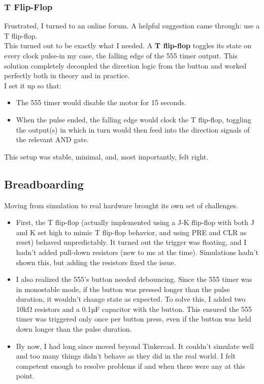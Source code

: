 \documentclass{article}
\begin{document}
\subsubsection{T Flip-Flop}
Frustrated, I turned to an online forum. A helpful suggestion came through: {use a T flip-flop.}\\
This turned out to be exactly what I needed. A \textbf{T flip-flop} toggles its state on every clock pulse-in my case, the falling edge of the 555 timer output. This solution completely decoupled the direction logic from the button and worked perfectly both in theory and in practice.\\[3pt]
I set it up so that:
\begin{itemize}[itemsep=-1mm]
	\item The {555 timer} would disable the motor for 15 seconds.
	\item When the pulse ended, the falling edge would clock the {T flip-flop}, toggling the output(s) in which in turn would then feed into the direction signals of the relevant AND gate.
\end{itemize}
This setup was stable, minimal, and, most importantly, felt right.

\subsection{Breadboarding}
Moving from simulation to real hardware brought its own set of challenges.
\begin{itemize}[itemsep=0mm]
	\item First, the {T flip-flop} (actually implemented using a J-K flip-flop with both J and K set high to mimic T flip-flop behavior, and using {PRE} and {CLR} as reset) behaved unpredictably. It turned out the trigger was {floating}, and I hadn’t added pull-down resistors (new to me at the time). Simulations hadn’t shown this, but adding the resistors fixed the issue.
	\item I also realized the 555’s button needed debouncing. Since the 555 timer was in monostable mode, if the button was pressed longer than the pulse duration, it wouldn’t change state as expected. To solve this, I added two 10kΩ resistors and a 0.1µF capacitor with the button. This ensured the 555 timer was triggered only once per button press, even if the button was held down longer than the pulse duration.
	\item By now, I had long since moved beyond Tinkercad. It couldn’t simulate well and too many things didn’t behave as they did in the real world. I felt competent enough to resolve problems if and when there were any at this point.
\end{itemize}
\newpage
\end{document}
